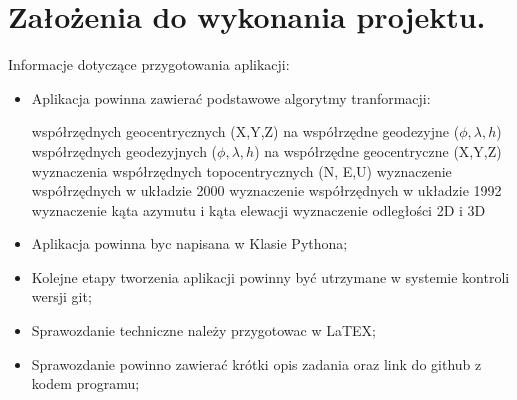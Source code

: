 \section{Założenia do wykonania projektu.}
Informacje dotyczące przygotowania aplikacji:
\begin{itemize}
	\item Aplikacja powinna zawierać podstawowe algorytmy tranformacji:

	\subitem współrzędnych geocentrycznych (X,Y,Z) na współrzędne geodezyjne ($\phi, \lambda, h$)
	\subitem współrzędnych geodezyjnych ($\phi, \lambda, h$) na współrzędne geocentryczne (X,Y,Z)
	\subitem wyznaczenia współrzędnych topocentrycznych (N, E,U)
	\subitem wyznaczenie współrzędnych w układzie 2000
	\subitem wyznaczenie współrzędnych w układzie 1992
	\subitem wyznaczenie kąta azymutu i kąta elewacji
	\subitem wyznaczenie odległości 2D i 3D
	
	
	\item Aplikacja powinna byc napisana w Klasie Pythona;
	
	\item  Kolejne etapy tworzenia aplikacji powinny być utrzymane w systemie kontroli wersji git;
	
	\item  Sprawozdanie techniczne należy przygotowac w LaTEX;
	
	\item Sprawozdanie powinno zawierać krótki opis zadania oraz link do github z kodem programu;
\end{itemize}